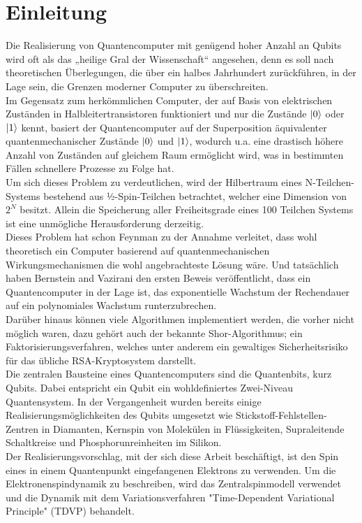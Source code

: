 \chapter{Einleitung}
Die Realisierung von Quantencomputer mit genügend hoher Anzahl an Qubits wird oft als das „heilige Gral der Wissenschaft“ angesehen, denn 
es soll nach theoretischen Überlegungen, die über ein halbes Jahrhundert zurückführen, in der Lage sein, die Grenzen moderner Computer zu 
überschreiten. \\
Im Gegensatz zum herkömmlichen Computer, der auf Basis von elektrischen Zuständen in Halbleitertransistoren funktioniert 
und nur die Zustände $\ket{0}$ oder $\ket{1}$ kennt, basiert der Quantencomputer auf der Superposition äquivalenter 
quantenmechanischer Zustände $\ket{0}$ und $\ket{1}$, wodurch u.a. eine drastisch höhere Anzahl von Zuständen auf gleichem Raum ermöglicht 
wird, was in bestimmten Fällen schnellere Prozesse zu Folge hat.\\
Um sich dieses Problem zu verdeutlichen, wird der Hilbertraum eines N-Teilchen-Systems bestehend aus ½-Spin-Teilchen betrachtet, welcher eine 
Dimension von $2^N$ besitzt. Allein die Speicherung aller Freiheitsgrade eines 100 Teilchen Systems ist eine unmögliche Herausforderung
derzeitig. \\
Dieses Problem hat schon Feynman zu der Annahme verleitet, dass wohl theoretisch ein Computer basierend 
auf quantenmechanischen Wirkungsmechanismen die wohl angebrachteste Lösung wäre. Und tatsächlich haben Bernstein and Vazirani 
den ersten Beweis veröffentlicht, dass ein Quantencomputer in der Lage ist, das exponentielle Wachstum der Rechendauer auf ein 
polynomiales Wachstum runterzubrechen\cite{10.1145/167088.167097}.\\
Darüber hinaus können viele Algorithmen implementiert werden, die vorher nicht möglich waren, dazu gehört auch der bekannte Shor-Algorithmus; 
ein Faktorisierungsverfahren, welches unter anderem ein gewaltiges Sicherheitsrisiko für das übliche RSA-Kryptosystem darstellt\cite{365700,10.1137/S0097539795293172}.\\

\noindent Die zentralen Bausteine eines Quantencomputers sind die Quantenbits, kurz Qubits. Dabei entspricht ein Qubit ein wohldefiniertes
Zwei-Niveau Quantensystem. In der Vergangenheit wurden bereits einige Realisierungsmöglichkeiten des Qubits umgesetzt wie Stickstoff-Fehlstellen-Zentren 
in Diamanten\cite{PhysRevLett.93.130501,Hanson2008-tn}, Kernspin von Molekülen in Flüssigkeiten\cite{RevModPhys.76.1037},
Supraleitende Schaltkreise\cite{RevModPhys.73.357} und Phosphorunreinheiten im Silikon\cite{Kane1998-pc}.\\
Der Realisierungsvorschlag, mit der sich diese Arbeit beschäftigt, ist den Spin eines in einem Quantenpunkt eingefangenen 
Elektrons zu verwenden\cite{Elzerman2004-wu,Bonadeo1998-nr,PMID:17901328,Fokina_2010,Spatzek2011-rn}. Um die Elektronenspindynamik zu beschreiben, wird 
das Zentralspinmodell verwendet und die Dynamik mit dem Variationsverfahren "Time-Dependent Variational Principle" (TDVP) behandelt.\\

